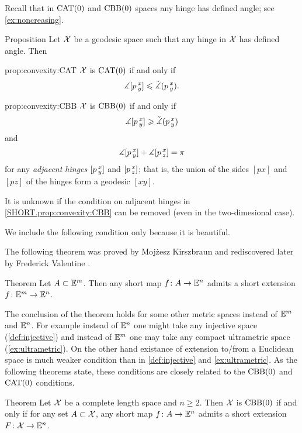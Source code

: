 Recall that in $\mathrm{CAT}(0)$ and $\mathrm{CBB}(0)$ spaces any hinge has defined angle; see \ref{ex:noncreasing}.

\begin{thm}{Proposition}\label{prop:convexity}
Let $\mathcal{X}$ be a geodesic space such that any hinge in $\mathcal{X}$ has defined angle.
Then 

\begin{subthm}{prop:convexity:CAT}
$\mathcal{X}$ is $\mathrm{CAT}(0)$ if and only if 
\[\measuredangle[p\,{}^{x}_{y}]\leqslant \tilde\measuredangle(p\,{}^{x}_{y}).\]
\end{subthm}

\begin{subthm}{prop:convexity:CBB}
$\mathcal{X}$ is $\mathrm{CBB}(0)$ if and only if 
\[\measuredangle[p\,{}^{x}_{y}]\geqslant \tilde\measuredangle(p\,{}^{x}_{y})\]
and 
\[\measuredangle[p\,{}^{x}_{y}]+\measuredangle[p\,{}^{x}_{z}]=\pi\]
for any {}\emph{adjacent hinges} $[p\,{}^{x}_{y}]$ and $[p\,{}^{x}_{z}]$;
that is, the union of the sides $[px]$ and $[pz]$ of the hinges form a geodesic $[xy]$.
\end{subthm}

\end{thm}

It is unknown if the condition on adjacent hinges in \ref{SHORT.prop:convexity:CBB} can be removed (even in the two-dimesional case).

We include the following condition only because it is beautiful.

The following theorem was proved by Mojżesz Kirszbraun \cite{kirszbraun} and rediscovered later by Frederick Valentine \cite{valentine}.

\begin{thm}{Theorem}
Let $A\subset \mathbb{E}^m$.
Then any short map $f\colon A\to \mathbb{E}^n$
admits a short extension $f\colon\mathbb{E}^m\to \mathbb{E}^n$.
\end{thm}

The conclusion of the theorem holds for some other metric spaces instead of $\mathbb{E}^m$ and $\mathbb{E}^n$.
For example instead of $\mathbb{E}^n$ one might take any injective space (\ref{def:injective}) and instead of $\mathbb{E}^m$ one may take any compact ultrametric space (\ref{ex:ultrametric}).
On the other hand existance of extension to/from a Euclidean space is much weaker condition than in \ref{def:injective} and \ref{ex:ultrametric}.
As the following theorems state, these conditions are closely related to the $\mathrm{CBB}(0)$ and $\mathrm{CAT}(0)$ conditions.

\begin{thm}{Theorem}
Let $\mathcal{X}$ be a complete length space and $n\ge 2$.
Then $\mathcal{X}$ is $\mathrm{CBB}(0)$ if and only if for any set $A\subset \mathcal{X}$, 
any short map $f\colon A\to \mathbb{E}^n$ 
admits a short extension $F\colon\mathcal{X}\to \mathbb{E}^n$.
\end{thm}

